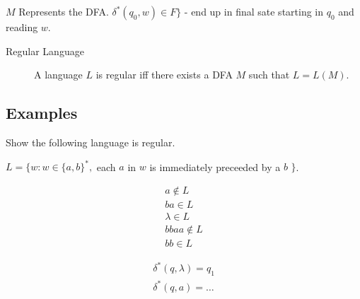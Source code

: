 \documentclass[12pt]{article}
\begin{document}
$M$ Represents the DFA. $\delta^*(q_0, w) \in F \}$ - end up in final
sate starting in $q_0$ and reading $w$.

\begin{description}
    \item[Regular Language] A language $L$ is regular iff there exists
                            a DFA $M$ such that $L = L(M)$.
\end{description}

\subsection*{Examples}
Show the following language is regular.

$L = \{ w: w \in \{a, b\}^*, $ each $a$ in $w$ is immediately preceeded
by a $b$ $\}$.

\begin{eqnarray*}
    a \notin L\\
    ba \in L\\
    \lambda \in L\\
    bbaa \notin L\\
    bb \in L
\end{eqnarray*}


\begin{eqnarray*}
    \delta^*(q, \lambda) = q_1\\
    \delta^*(q, a) = \ldots
\end{eqnarray*}
\end{document}
